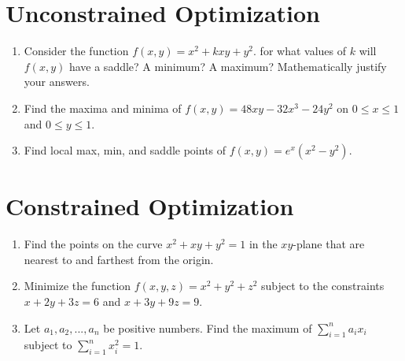 \documentclass[letterpaper, 11pt]{article}
\begin{document}
\section{Unconstrained Optimization}
\begin{enumerate}
\item Consider the function $f(x,y) = x^2 + kxy + y^2$. for what values of $k$ will $f(x,y)$ have a saddle? A minimum? A maximum? Mathematically justify your answers. 


\item Find the maxima and minima of $f(x,y) = 48xy - 32x^3 - 24y^2$ on $0 \leq x \leq 1$ and $ 0 \leq y \leq 1$.


\item Find local max, min, and saddle points of $f(x,y) = e^x(x^2 - y^2)$. 



\end{enumerate}

\section{Constrained Optimization}
\begin{enumerate}
\item Find the points on the curve $x^2 +xy + y^2 = 1$ in the $xy$-plane that are nearest to and farthest from the origin. 

\item Minimize the function $f(x,y,z) = x^2 + y^2 + z^2$ subject to the constraints $x+2y+3z = 6$ and $ x+3y+9z =9$.

\item Let $a_1,a_2, ...,a_n$ be positive numbers. Find the maximum of $\sum_{i=1}^n a_i x_i$ subject to $ \sum_{i=1}^n x_i^2 = 1$.


\end{enumerate}

\end{document}
